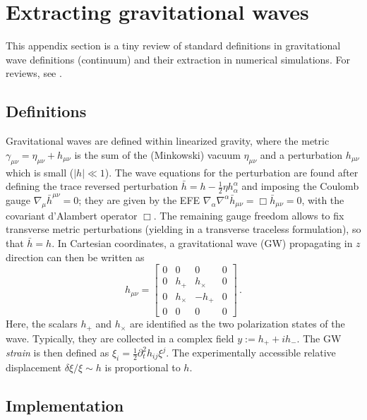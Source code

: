 
\section{Extracting gravitational waves}
\label{sec:extracting-gws}

This appendix section is a tiny review of standard definitions in gravitational
wave definitions (continuum) and their extraction in numerical simulations.
For reviews, see \eg \cite{Centrella:2010,Bishop2016,Baumgarte2010b}.

\subsection*{Definitions}

Gravitational waves are defined within linearized gravity, \ie where the metric
$\gamma_{\mu\nu} = \eta_{\mu\nu} + h_{\mu\nu}$ is the sum of the (Minkowski)
vacuum $\eta_{\mu\nu}$ and a perturbation $h_{\mu\nu}$ which is small
($|h|\ll 1$). The wave equations for the perturbation are found after defining
the trace reversed perturbation $\bar h = h - \frac 12 \eta 
h_\alpha^\alpha$ and imposing the Coulomb gauge $\nabla_\mu \bar h^{\mu\nu}=0$;
they are given by the EFE $\nabla_\alpha \nabla^\alpha \bar h_{\mu\nu}
= \Box \bar h_{\mu\nu} = 0$, with the covariant d'Alambert operator $\Box$.
The remaining gauge freedom allows to fix transverse metric perturbations
(yielding in a transverse traceless formulation), so that $\bar h = h$. In
Cartesian coordinates, a gravitational wave (GW) propagating in $z$ direction can
then be written as
	$$
	h_{\mu\nu} = 
	\begin{bmatrix}
	0 & 0 & 0 & 0 \\
	0 & h_{+} & h_{\times} & 0 \\
	0 & h_{\times} & - h_{+} & 0 \\
	0 & 0 & 0 & 0
	\end{bmatrix} \,.
	$$
Here, the scalars $h_{+}$ and $h_\times$ are identified as the two polarization
states of the wave. Typically, they are collected in a complex field
$y := h_{+} + ih_{-}$. The GW \emph{strain} is then defined as
$\xi_i = \frac 12 \partial_t^2 h_{ij} \xi^j$. The experimentally accessible
relative displacement $\delta \xi / \xi \sim h$ is proportional to $h$.

\subsection*{Implementation}

